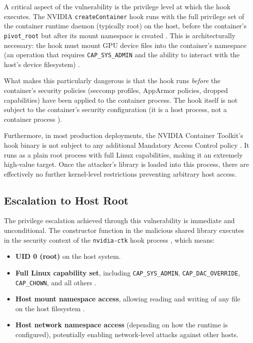 A critical aspect of the vulnerability is the privilege level at which the hook executes. The NVIDIA \texttt{createContainer} hook runs with the full privilege set of the container runtime daemon (typically root) on the host, before the container's \texttt{pivot\_root} but after its mount namespace is created \cite{oci_runtime_spec}. This is architecturally necessary: the hook must mount GPU device files into the container's namespace (an operation that requires \texttt{CAP\_SYS\_ADMIN} and the ability to interact with the host's device filesystem) \cite{linux_capabilities_manpage}.
 
What makes this particularly dangerous is that the hook runs \textit{before} the container's security policies (seccomp profiles, AppArmor policies, dropped capabilities) have been applied to the container process. The hook itself is not subject to the container's security configuration (it is a host process, not a container process \cite{nvidia_ctk_docs}).
 
Furthermore, in most production deployments, the NVIDIA Container Toolkit's hook binary is not subject to any additional Mandatory Access Control policy \cite{nvidia_advisory_2025}. It runs as a plain root process with full Linux capabilities, making it an extremely high-value target. Once the attacker's library is loaded into this process, there are effectively no further kernel-level restrictions preventing arbitrary host access.

\subsection{Escalation to Host Root}
\label{subsec:escalation}

The privilege escalation achieved through this vulnerability is immediate and unconditional. The constructor function in the malicious shared library executes in the security context of the \texttt{nvidia-ctk} hook process \cite{nvd_cve_2025_23266}, which means:
 
\begin{itemize}
  \item \textbf{UID 0 (root)} on the host system.
  \item \textbf{Full Linux capability set}, including \texttt{CAP\_SYS\_ADMIN}, \texttt{CAP\_DAC\_OVERRIDE},\\ \texttt{CAP\_CHOWN}, and all others \cite{linux_capabilities_manpage}.
  \item \textbf{Host mount namespace access}, allowing reading and writing of any file on the host filesystem \cite{linux_namespaces_manpage}.
  \item \textbf{Host network namespace access} (depending on how the runtime is configured), potentially enabling network-level attacks against other hosts.
\end{itemize}
 
